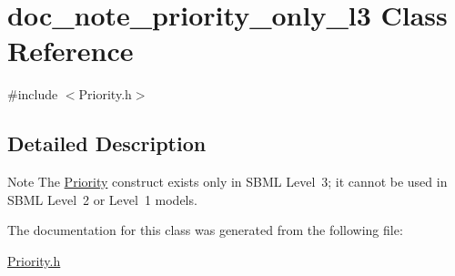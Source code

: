 \hypertarget{classdoc__note__priority__only__l3}{}\section{doc\+\_\+note\+\_\+priority\+\_\+only\+\_\+l3 Class Reference}
\label{classdoc__note__priority__only__l3}


{\ttfamily \#include $<$Priority.\+h$>$}



\subsection{Detailed Description}
\begin{DoxyNote}{Note}
The \hyperlink{class_priority}{Priority} construct exists only in S\+B\+ML Level~3; it cannot be used in S\+B\+ML Level~2 or Level~1 models. 
\end{DoxyNote}


The documentation for this class was generated from the following file\+:\begin{DoxyCompactItemize}
\item 
\hyperlink{_priority_8h}{Priority.\+h}\end{DoxyCompactItemize}
